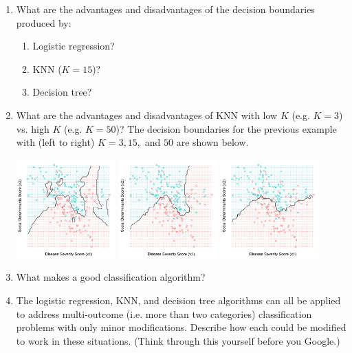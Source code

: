 \begin{enumerate}
\item What are the advantages and disadvantages of the decision boundaries produced by:
  \begin{enumerate}
  \item Logistic regression?
  \item KNN ($K=15$)?
  \item Decision tree?
  \end{enumerate}
\item What are the advantages and disadvantages of KNN with low $K$ (e.g. $K=3$) vs. high $K$ (e.g. $K=50$)? The decision boundaries for the previous example with (left to right) $K=3, 15,$ and $50$ are shown below.
\begin{center}
\includegraphics[width=0.3\textwidth]{img/esl-knn-3.png}
\includegraphics[width=0.3\textwidth]{img/esl-knn-15.png}
\includegraphics[width=0.3\textwidth]{img/esl-knn-50.png}
\end{center}
\item What makes a good classification algorithm?
\item The logistic regression, KNN, and decision tree algorithms can all be applied to address multi-outcome (i.e. more than two categories) classification problems with only minor modifications. Describe how each could be modified to work in these situations. (Think through this yourself before you Google.)
\end{enumerate}



